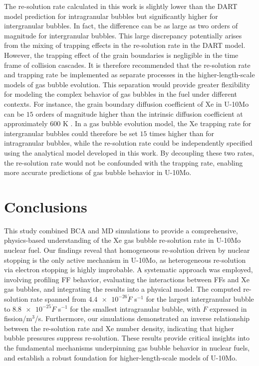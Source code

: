 \documentclass[review]{elsarticle}
\begin{document}
The re-solution rate calculated in this work is slightly lower than the DART model prediction for intragranular bubbles but significantly higher for intergranular bubbles. In fact, the difference can be as large as two orders of magnitude for intergranular bubbles. This large discrepancy potentially arises from the mixing of trapping effects in the re-solution rate in the DART model. However, the trapping effect of the grain boundaries is negligible in the time frame of collision cascades. It is therefore recommended that the re-solution rate and trapping rate be implemented as separate processes in the higher-length-scale models of gas bubble evolution. This separation would provide greater flexibility for modeling the complex behavior of gas bubbles in the fuel under different contexts. For instance, the grain boundary diffusion coefficient of Xe in U-10Mo can be $15$ orders of magnitude higher than the intrinsic diffusion coefficient at approximately 600 K \cite{hasan2024gb}. In a gas bubble evolution model, the Xe trapping rate for intergranular bubbles could therefore be set $15$ times higher than for intragranular bubbles, while the re-solution rate could be independently specified using the analytical model developed in this work. By decoupling these two rates, the re-solution rate would not be confounded with the trapping rate, enabling more accurate predictions of gas bubble behavior in U-10Mo.


\section{Conclusions}

This study combined BCA and MD simulations to provide a comprehensive, physics-based understanding of the Xe gas bubble re-solution rate in U-10Mo nuclear fuel. Our findings reveal that homogeneous re-solution driven by nuclear stopping is the only active mechanism in U-10Mo, as heterogeneous re-solution via electron stopping is highly improbable. A systematic approach was employed, involving profiling FF behavior, evaluating the interactions between FFs and Xe gas bubbles, and integrating the results into a physical model. The computed re-solution rate spanned from $\num{4.4e-26} \dot{F}$ s$^{-1}$ for the largest intergranular bubble to $\num{8.8e-25} \dot{F}$ s$^{-1}$ for the smallest intragranular bubble, with $\dot{F}$ expressed in fission/m$^3$/s. Furthermore, our simulations demonstrated an inverse relationship between the re-solution rate and Xe number density, indicating that higher bubble pressures suppress re-solution. These results provide critical insights into the fundamental mechanisms underpinning gas bubble behavior in nuclear fuels, and establish a robust foundation for higher-length-scale models of U-10Mo.
\end{document}
